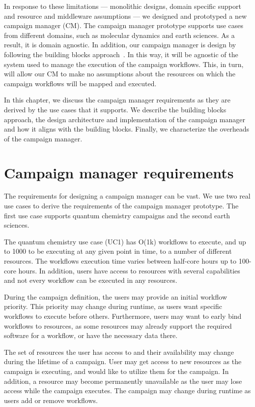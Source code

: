 In response to these limitations --- monolithic designs, domain specific support and resource and middleware assumptions --- we designed and prototyped a new campaign manager (CM).
The campaign manager prototype supports use cases from different domains, such as molecular dynamics and earth sciences.
As a result, it is domain agnostic.
In addition, our campaign manager is design by following the building blocks approach~\cite{turilli2019middleware}.
In this way, it will be agnostic of the system used to manage the execution of the campaign workflows.
This, in turn, will allow our CM to make no assumptions about the resources on which the campaign workflows will be mapped and executed.

In this chapter, we discuss the campaign manager requirements as they are derived by the use cases that it supports.
We describe the building blocks approach, the design architecture and implementation of the campaign manager and how it aligns with the building blocks.
Finally, we characterize the overheads of the campaign manager.

\section{Campaign manager requirements}
The requirements for designing a campaign manager can be vast.
We use two real use cases to derive the requirements of the campaign manager prototype.
The first use case supports quantum chemistry campaigns and the second earth sciences.

The quantum chemistry use case (UC1) has O(1k) workflows to execute, and up to 1000 to be executing at any given point in time, to a number of different resources. 
The workflows execution time varies between half-core hours up to 100-core hours.
In addition, users have access to resources with several capabilities and not every workflow can be executed in any resources. 

During the campaign definition, the users may provide an initial workflow priority.
This priority may change during runtime, as users want specific workflows to execute before others.
Furthermore, users may want to early bind workflows to resources, as some resources may already support the required software for a workflow, or have the necessary data there.

The set of resources the user has access to and their availability may change during the lifetime of a campaign.
User may get access to new resources as the campaign is executing, and would like to utilize them for the campaign.
In addition, a resource may become permanently unavailable as the user may lose access while the campaign executes.
The campaign may change during runtime as users add or remove workflows.


